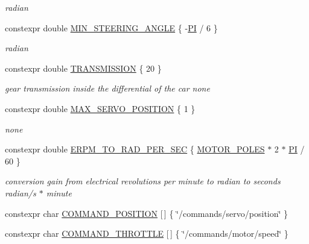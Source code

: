 \begin{DoxyCompactItemize}
\begin{DoxyCompactList}\small\item\em radian \end{DoxyCompactList}\item 
constexpr double \hyperlink{namespacecar__config_a38229ce5d2e17e0c30b86864fb20d9ce}{M\+I\+N\+\_\+\+S\+T\+E\+E\+R\+I\+N\+G\+\_\+\+A\+N\+G\+LE} \{ -\/\hyperlink{namespacecar__config_a90cb9957197db8924811c447bc98703a}{PI} / 6 \}
\begin{DoxyCompactList}\small\item\em radian \end{DoxyCompactList}\item 
constexpr double \hyperlink{namespacecar__config_a7af97a6c9168673aba8917029cfe44d3}{T\+R\+A\+N\+S\+M\+I\+S\+S\+I\+ON} \{ 20 \}
\begin{DoxyCompactList}\small\item\em gear transmission inside the differential of the car  none \end{DoxyCompactList}\item 
constexpr double \hyperlink{namespacecar__config_af1712762f3ad9f8805ba474d5f3e7274}{M\+A\+X\+\_\+\+S\+E\+R\+V\+O\+\_\+\+P\+O\+S\+I\+T\+I\+ON} \{ 1 \}
\begin{DoxyCompactList}\small\item\em none \end{DoxyCompactList}\item 
constexpr double \hyperlink{namespacecar__config_a877c4a772a47f4737d9f03fe8a22e106}{E\+R\+P\+M\+\_\+\+T\+O\+\_\+\+R\+A\+D\+\_\+\+P\+E\+R\+\_\+\+S\+EC} \{ \hyperlink{namespacecar__config_a611a0f02cf52db1d438a2dd53b642cd5}{M\+O\+T\+O\+R\+\_\+\+P\+O\+L\+ES} $\ast$ 2 $\ast$ \hyperlink{namespacecar__config_a90cb9957197db8924811c447bc98703a}{PI} / 60 \}
\begin{DoxyCompactList}\small\item\em conversion gain from electrical revolutions per minute to radian to seconds  radian/s $\ast$ minute \end{DoxyCompactList}\item 
constexpr char \hyperlink{namespacecar__config_a6008524bf1090f0ab0c994b2f80dcb22}{C\+O\+M\+M\+A\+N\+D\+\_\+\+P\+O\+S\+I\+T\+I\+ON} \mbox{[}$\,$\mbox{]} \{ \char`\"{}/commands/servo/position\char`\"{} \}
\item 
constexpr char \hyperlink{namespacecar__config_afdb192c52a9126c0bedf2ca4a7c99c2a}{C\+O\+M\+M\+A\+N\+D\+\_\+\+T\+H\+R\+O\+T\+T\+LE} \mbox{[}$\,$\mbox{]} \{ \char`\"{}/commands/motor/speed\char`\"{} \}

\end{DoxyCompactItemize}
